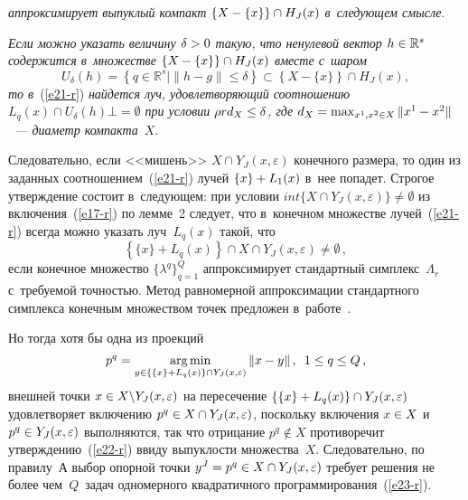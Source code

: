 \begin{multicols}{2}
\vspace*{-4pt}

\noindent
\textit{аппроксимирует выпуклый компакт $\{X\hm -\{x\}\} \hm\cap H_J(x)$ 
в~следующем смысле}.

\textit{Если можно указать величину $\delta\hm>0$ такую, что ненулевой 
вектор $h\hm\in \mathbb{R}^s$ содержится в~множестве $\{ X\hm- \{x\} \} 
\cap H_J(x)$ вместе с~шаром}
$$
U_\delta(h) =\left\{ q\in \mathbb{R}^s\vert \| h-g\| \leq\delta\right\}\subset \left\{ 
X-\{x\}\right\} \cap H_J(x),
$$
\textit{то в}~(\ref{e21-r}) \textit{найдется луч, удовлетворяющий 
соотношению $L_q(x)\cap U_\delta(h)\bot=\emptyset$ при условии $\rho r 
d_X\hm\leq \delta$, где $d_X\hm= \max\nolimits_{x^1, x^2\in X} \| x^1\hm- 
x^2\|$~--- диаметр компакта~$X$}.


  Следовательно, если <<мишень>> $X\cap Y_J(x,\varepsilon)$ конечного 
размера, то один из заданных соотношением~(\ref{e21-r}) лучей $\{x\} \hm+ 
L_1(x)$ в~нее попадет. Строгое утверждение состоит в~следующем: при 
условии $int \{ X\cap Y_J(x,\varepsilon)\}\not= \emptyset$ из 
включения~(\ref{e17-r}) по лемме~2 следует, что в~конечном множестве 
лучей~(\ref{e21-r}) всегда можно указать луч~$L_q(x)$ такой, что
  \begin{equation}
  \left\{ \{x\} +L_q(x)\right\} \cap X\cap Y_J(x,\varepsilon)\not= \emptyset\,,
  \label{e22-r}
  \end{equation}
если конечное множество $\{\lambda^q\}^Q_{q=1}$ аппроксимирует 
стандартный симплекс~$\Lambda_r$ с~тре\-бу\-емой точ\-ностью. Метод 
равномерной аппроксимации стандартного симплекса конечным множеством 
точек предложен в~работе~\cite{4-r}.

  Но тогда хотя бы одна из проекций
  \begin{equation}
  p^q=\mathop{\mathrm{arg}\,\mathrm{min}}\limits_{y\in \{ \{x\} +L_q(x)\} \cap Y_J(x,\varepsilon)} \| x-
y\|\,,\enskip 1\leq q\leq Q\,,
 \label{e23-r}
  \end{equation}
внешней точки $x\hm\in X\backslash Y_J(x,\varepsilon)$ на пересечение $\{ \{ 
x\} \hm+ L_q(x)\} \cap Y_J(x,\varepsilon)$ удовлетворяет включению 
$p^q\hm\in X\cap Y_J(x,\varepsilon)$, поскольку включения $x\hm\in X$ 
и~$p^q\hm\in Y_J(x,\varepsilon)$ выполняются, так что отрицание $p^q\not\in 
X$ противоречит утверждению~(\ref{e22-r}) ввиду выпуклости 
множества~$X$. Следовательно, по правилу~А выбор опорной точки 
$y^J\hm= p^q\hm\in X\cap Y_J(x,\varepsilon)$ требует решения не более 
чем~$Q$~задач одномерного квадратичного программирования~(\ref{e23-r}).


\end{multicols}

